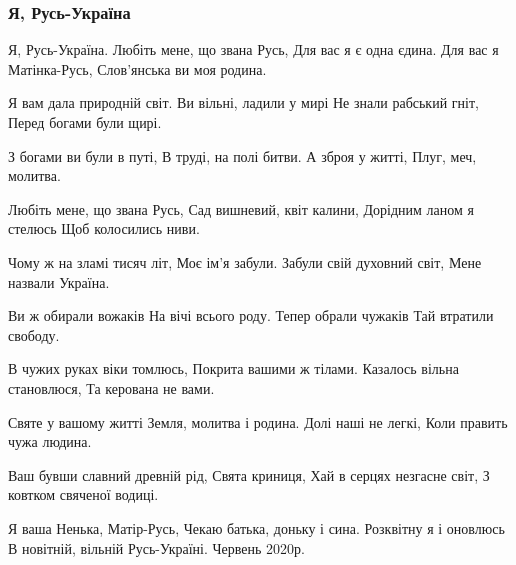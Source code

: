  
 
 

\subsubsection{Я, Русь-Україна}


Я, Русь-Україна.
Любіть мене, що звана Русь,
Для вас я є одна єдина.
Для вас я Матінка-Русь,
Слов'янська ви моя родина.

Я вам дала природній світ.
Ви вільні, ладили у мирі
Не знали рабський гніт,
Перед богами були щирі.

З богами ви були в путі,
В труді, на полі битви.
А зброя у житті,
Плуг, меч, молитва.

Любіть мене, що звана Русь,
Сад вишневий, квіт калини,
Дорідним ланом я стелюсь
Щоб колосились ниви.

Чому ж на зламі тисяч літ,
Моє ім'я забули.
Забули свій духовний світ,
Мене назвали Україна.

Ви ж обирали вожаків
На вічі всього роду.
Тепер обрали чужаків
Тай втратили свободу.

В чужих руках віки томлюсь,
Покрита вашими ж тілами.
Казалось вільна становлюся,
Та керована не вами.

Святе у вашому житті
Земля, молитва і родина.
Долі наші не легкі,
Коли править чужа людина.

Ваш бувши славний древній рід,
Свята криниця,
Хай в серцях незгасне світ,
З ковтком свяченої водиці.

Я ваша Ненька, Матір-Русь,
Чекаю батька, доньку і сина.
Розквітну я і оновлюсь
В новітній, вільній Русь-Україні.
Червень 2020р.

